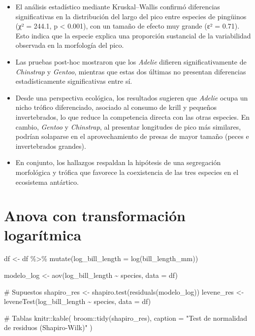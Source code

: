 \documentclass[
  spanish,
  11pt,
  a4paper,
  DIV=11,
  numbers=noendperiod]{scrartcl}
\newenvironment{Shaded}{\begin{snugshade}}{\end{snugshade}}
\newcommand{\AttributeTok}[1]{\textcolor[rgb]{0.40,0.45,0.13}{#1}}
\newcommand{\CommentTok}[1]{\textcolor[rgb]{0.37,0.37,0.37}{#1}}
\newcommand{\FunctionTok}[1]{\textcolor[rgb]{0.28,0.35,0.67}{#1}}
\newcommand{\NormalTok}[1]{\textcolor[rgb]{0.00,0.23,0.31}{#1}}
\newcommand{\OtherTok}[1]{\textcolor[rgb]{0.00,0.23,0.31}{#1}}
\newcommand{\SpecialCharTok}[1]{\textcolor[rgb]{0.37,0.37,0.37}{#1}}
\newcommand{\StringTok}[1]{\textcolor[rgb]{0.13,0.47,0.30}{#1}}
\begin{document}
\begin{itemize}
\item
  El análisis estadístico mediante Kruskal--Wallis confirmó diferencias
  significativas en la distribución del largo del pico entre especies de
  pingüinos (χ² = 244.1, p \textless{} 0.001), con un tamaño de efecto
  muy grande (ε² = 0.71). Esto indica que la especie explica una
  proporción sustancial de la variabilidad observada en la morfología
  del pico.
\item
  Las pruebas post-hoc mostraron que los \emph{Adelie} difieren
  significativamente de \emph{Chinstrap} y \emph{Gentoo}, mientras que
  estas dos últimas no presentan diferencias estadísticamente
  significativas entre sí.
\item
  Desde una perspectiva ecológica, los resultados sugieren que
  \emph{Adelie} ocupa un nicho trófico diferenciado, asociado al consumo
  de krill y pequeños invertebrados, lo que reduce la competencia
  directa con las otras especies. En cambio, \emph{Gentoo} y
  \emph{Chinstrap}, al presentar longitudes de pico más similares,
  podrían solaparse en el aprovechamiento de presas de mayor tamaño
  (peces e invertebrados grandes).
\item
  En conjunto, los hallazgos respaldan la hipótesis de una segregación
  morfológica y trófica que favorece la coexistencia de las tres
  especies en el ecosistema antártico.
\end{itemize}

\section{Anova con transformación
logarítmica}\label{anova-con-transformaciuxf3n-logaruxedtmica}

\begin{Shaded}
\begin{Highlighting}[numbers=left,,]
\NormalTok{df }\OtherTok{\textless{}{-}}\NormalTok{ df }\SpecialCharTok{\%\textgreater{}\%}
  \FunctionTok{mutate}\NormalTok{(}\AttributeTok{log\_bill\_length =} \FunctionTok{log}\NormalTok{(bill\_length\_mm))}

\NormalTok{modelo\_log }\OtherTok{\textless{}{-}} \FunctionTok{aov}\NormalTok{(log\_bill\_length }\SpecialCharTok{\textasciitilde{}}\NormalTok{ species, }\AttributeTok{data =}\NormalTok{ df)}

\CommentTok{\# Supuestos}
\NormalTok{shapiro\_res }\OtherTok{\textless{}{-}} \FunctionTok{shapiro.test}\NormalTok{(}\FunctionTok{residuals}\NormalTok{(modelo\_log))}
\NormalTok{levene\_res  }\OtherTok{\textless{}{-}} \FunctionTok{leveneTest}\NormalTok{(log\_bill\_length }\SpecialCharTok{\textasciitilde{}}\NormalTok{ species, }\AttributeTok{data =}\NormalTok{ df)}

\CommentTok{\# Tablas}
\NormalTok{knitr}\SpecialCharTok{::}\FunctionTok{kable}\NormalTok{(}
\NormalTok{  broom}\SpecialCharTok{::}\FunctionTok{tidy}\NormalTok{(shapiro\_res),}
  \AttributeTok{caption =} \StringTok{"Test de normalidad de residuos (Shapiro{-}Wilk)"}
\NormalTok{)}
\end{Highlighting}
\end{Shaded}
\end{document}
